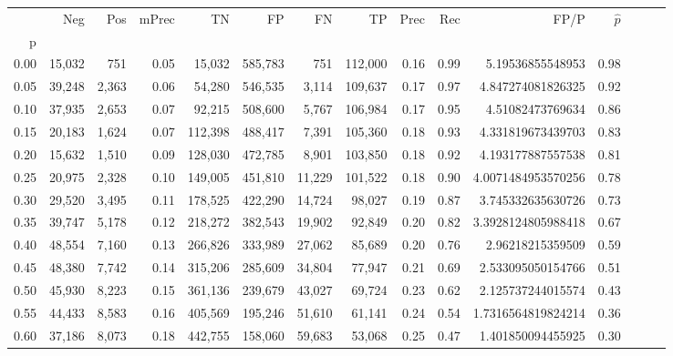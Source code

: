 \begin{tabular}{rrrrrrrrrrrrrrr}
\toprule
{} &     Neg &    Pos & mPrec &       TN &       FP &       FN &       TP &  Prec &   Rec &                 FP/P & $\hat{p}$ \\
p    &         &        &       &          &          &          &          &       &       &                      &           \\
\midrule
0.00 &  15,032 &    751 &  0.05 &   15,032 &  585,783 &      751 &  112,000 &  0.16 &  0.99 &     5.19536855548953 &      0.98 \\
0.05 &  39,248 &  2,363 &  0.06 &   54,280 &  546,535 &    3,114 &  109,637 &  0.17 &  0.97 &    4.847274081826325 &      0.92 \\
0.10 &  37,935 &  2,653 &  0.07 &   92,215 &  508,600 &    5,767 &  106,984 &  0.17 &  0.95 &     4.51082473769634 &      0.86 \\
0.15 &  20,183 &  1,624 &  0.07 &  112,398 &  488,417 &    7,391 &  105,360 &  0.18 &  0.93 &    4.331819673439703 &      0.83 \\
0.20 &  15,632 &  1,510 &  0.09 &  128,030 &  472,785 &    8,901 &  103,850 &  0.18 &  0.92 &    4.193177887557538 &      0.81 \\
0.25 &  20,975 &  2,328 &  0.10 &  149,005 &  451,810 &   11,229 &  101,522 &  0.18 &  0.90 &   4.0071484953570256 &      0.78 \\
0.30 &  29,520 &  3,495 &  0.11 &  178,525 &  422,290 &   14,724 &   98,027 &  0.19 &  0.87 &    3.745332635630726 &      0.73 \\
0.35 &  39,747 &  5,178 &  0.12 &  218,272 &  382,543 &   19,902 &   92,849 &  0.20 &  0.82 &   3.3928124805988418 &      0.67 \\
0.40 &  48,554 &  7,160 &  0.13 &  266,826 &  333,989 &   27,062 &   85,689 &  0.20 &  0.76 &     2.96218215359509 &      0.59 \\
0.45 &  48,380 &  7,742 &  0.14 &  315,206 &  285,609 &   34,804 &   77,947 &  0.21 &  0.69 &    2.533095050154766 &      0.51 \\
0.50 &  45,930 &  8,223 &  0.15 &  361,136 &  239,679 &   43,027 &   69,724 &  0.23 &  0.62 &    2.125737244015574 &      0.43 \\
0.55 &  44,433 &  8,583 &  0.16 &  405,569 &  195,246 &   51,610 &   61,141 &  0.24 &  0.54 &   1.7316564819824214 &      0.36 \\
0.60 &  37,186 &  8,073 &  0.18 &  442,755 &  158,060 &   59,683 &   53,068 &  0.25 &  0.47 &    1.401850094455925 &      0.30 \\

\end{tabular}
